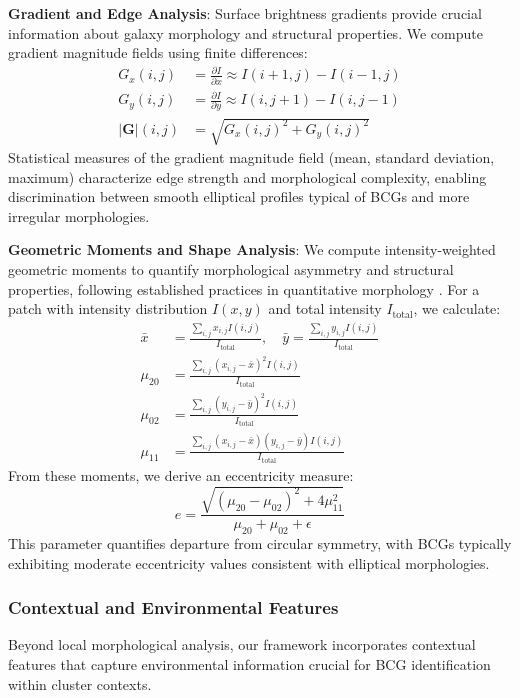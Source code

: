 \documentclass[twocolumn,10pt]{aastex631}
\begin{document}
\textbf{Gradient and Edge Analysis}: Surface brightness gradients provide crucial information about galaxy morphology and structural properties. We compute gradient magnitude fields using finite differences:
\begin{align}
G_x(i,j) &= \frac{\partial I}{\partial x} \approx I(i+1,j) - I(i-1,j) \\
G_y(i,j) &= \frac{\partial I}{\partial y} \approx I(i,j+1) - I(i,j-1) \\
|\mathbf{G}|(i,j) &= \sqrt{G_x(i,j)^2 + G_y(i,j)^2}
\end{align}
Statistical measures of the gradient magnitude field (mean, standard deviation, maximum) characterize edge strength and morphological complexity, enabling discrimination between smooth elliptical profiles typical of BCGs and more irregular morphologies.

\textbf{Geometric Moments and Shape Analysis}: We compute intensity-weighted geometric moments to quantify morphological asymmetry and structural properties, following established practices in quantitative morphology \citep{Hambleton2011}. For a patch with intensity distribution $I(x,y)$ and total intensity $I_{\text{total}}$, we calculate:
\begin{align}
\bar{x} &= \frac{\sum_{i,j} x_{i,j} I(i,j)}{I_{\text{total}}}, \quad \bar{y} = \frac{\sum_{i,j} y_{i,j} I(i,j)}{I_{\text{total}}} \\
\mu_{20} &= \frac{\sum_{i,j} (x_{i,j} - \bar{x})^2 I(i,j)}{I_{\text{total}}} \\
\mu_{02} &= \frac{\sum_{i,j} (y_{i,j} - \bar{y})^2 I(i,j)}{I_{\text{total}}} \\
\mu_{11} &= \frac{\sum_{i,j} (x_{i,j} - \bar{x})(y_{i,j} - \bar{y}) I(i,j)}{I_{\text{total}}}
\end{align}
From these moments, we derive an eccentricity measure:
\begin{equation}
e = \frac{\sqrt{(\mu_{20} - \mu_{02})^2 + 4\mu_{11}^2}}{\mu_{20} + \mu_{02} + \epsilon}
\end{equation}
This parameter quantifies departure from circular symmetry, with BCGs typically exhibiting moderate eccentricity values consistent with elliptical morphologies.

\subsubsection{Contextual and Environmental Features}

Beyond local morphological analysis, our framework incorporates contextual features that capture environmental information crucial for BCG identification within cluster contexts.
\end{document}
